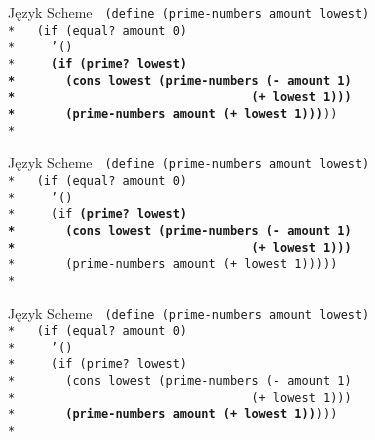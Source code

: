 \begin{frame}{Język Scheme}
  \texttt{
(define (prime-numbers amount lowest)\\*
\ \ (if (equal?\ amount 0)\\*
\ \ \ \ '()\\*
\ \ \ \ \textbf{(if (prime?\ lowest)\\*
\ \ \ \ \ \ (cons lowest (prime-numbers (- amount 1)\\*
\ \ \ \ \ \ \ \ \ \ \ \ \ \ \ \ \
\ \ \ \ \ \ \ \ \ \ \ \ \ \ \ (+ lowest 1)))\\*
\ \ \ \ \ \ (prime-numbers amount (+ lowest 1)))}))\\*
  }
\end{frame}

\begin{frame}{Język Scheme}
  \texttt{
(define (prime-numbers amount lowest)\\*
\ \ (if (equal?\ amount 0)\\*
\ \ \ \ '()\\*
\ \ \ \ (if \textbf{(prime?\ lowest)\\*
\ \ \ \ \ \ (cons lowest (prime-numbers (- amount 1)\\*
\ \ \ \ \ \ \ \ \ \ \ \ \ \ \ \ \
\ \ \ \ \ \ \ \ \ \ \ \ \ \ \ (+ lowest 1)))}\\*
\ \ \ \ \ \ (prime-numbers amount (+ lowest 1)))))\\*
  }
\end{frame}

\begin{frame}{Język Scheme}
  \texttt{
(define (prime-numbers amount lowest)\\*
\ \ (if (equal?\ amount 0)\\*
\ \ \ \ '()\\*
\ \ \ \ (if (prime?\ lowest)\\*
\ \ \ \ \ \ (cons lowest (prime-numbers (- amount 1)\\*
\ \ \ \ \ \ \ \ \ \ \ \ \ \ \ \ \
\ \ \ \ \ \ \ \ \ \ \ \ \ \ \ (+ lowest 1)))\\*
\ \ \ \ \ \ \textbf{(prime-numbers amount (+ lowest 1))})))\\*
  }
\end{frame}
